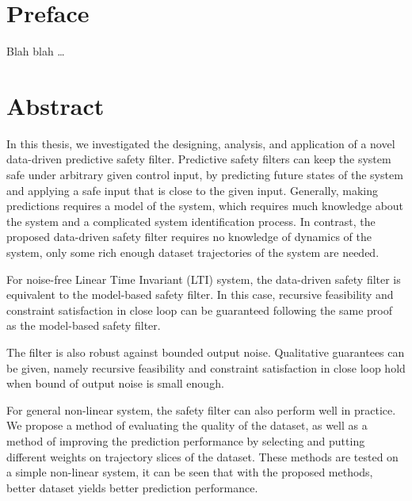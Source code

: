 
\chapter*{Preface}

Blah blah \dots

 \cleardoublepage


 \setcounter{tocdepth}{2}
 \tableofcontents

 \cleardoublepage


\chapter*{Abstract}

In this thesis, we investigated the designing, analysis, and application of a novel data-driven predictive safety filter.
Predictive safety filters can keep the system safe under arbitrary given control input, by predicting future states of the system and applying a safe input that is close to the given input.
Generally, making predictions requires a model of the system, which requires much knowledge about the system and a complicated system identification process.
In contrast, the proposed data-driven safety filter requires no knowledge of dynamics of the system, only some rich enough dataset trajectories of the system are needed.

For noise-free Linear Time Invariant (LTI) system, the data-driven safety filter is equivalent to the model-based safety filter.
In this case, recursive feasibility and constraint satisfaction in close loop can be guaranteed following the same proof as the model-based safety filter.

The filter is also robust against bounded output noise.
Qualitative guarantees can be given, namely recursive feasibility and constraint satisfaction in close loop hold when bound of output noise is small enough.

For general non-linear system, the safety filter can also perform well in practice.
We propose a method of evaluating the quality of the dataset, as well as a method of improving the prediction performance by selecting and putting different weights on trajectory slices of the dataset.
These methods are tested on a simple non-linear system, it can be seen that with the proposed methods, better dataset yields better prediction performance.

